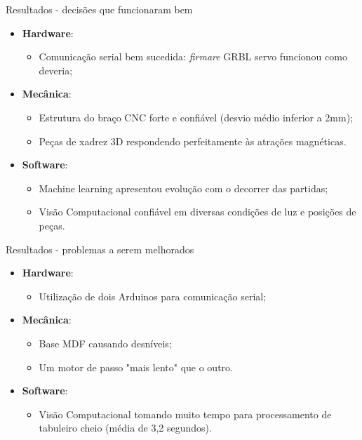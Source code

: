 \documentclass{beamer}
\begin{document}
\begin{frame}{Resultados - decisões que funcionaram bem}
  \begin{itemize}
  \item \textbf{Hardware}:
        \begin{itemize}
            \item Comunicação serial bem sucedida: \textit{firmare} GRBL servo funcionou como deveria;
        \end{itemize}
    \item \textbf{Mecânica}:
        \begin{itemize}
            \item Estrutura do braço CNC forte e confiável (desvio médio inferior a 2mm);
            \item Peças de xadrez 3D respondendo perfeitamente às atrações magnéticas.
        \end{itemize}
    \item \textbf{Software}:
        \begin{itemize}
            \item Machine learning apresentou evolução com o decorrer das partidas;
            \item Visão Computacional confiável em diversas condições de luz e posições de peças.
        \end{itemize}
  \end{itemize}
\end{frame}

\begin{frame}{Resultados - problemas a serem melhorados}
  \begin{itemize}
  \item \textbf{Hardware}:
        \begin{itemize}
            \item Utilização de dois Arduinos para comunicação serial; 
        \end{itemize}
    \item \textbf{Mecânica}:
        \begin{itemize}
            \item Base MDF causando desníveis;
            \item Um motor de passo "mais lento" que o outro.
        \end{itemize}
    \item \textbf{Software}:
        \begin{itemize}
            \item Visão Computacional tomando muito tempo para processamento de tabuleiro cheio (média de 3,2 segundos).
        \end{itemize}
  \end{itemize}
\end{frame}
\end{document}

